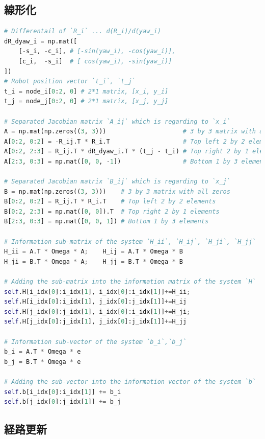 \documentclass{article}
\begin{document}
\subsection{線形化}

\begin{lstlisting}[language=python]
# Differentail of `R_i` ... d(R_i)/d(yaw_i)
dR_dyaw_i = np.mat([
    [-s_i, -c_i], # [-sin(yaw_i), -cos(yaw_i)],
    [c_i,  -s_i]  # [ cos(yaw_i), -sin(yaw_i)]
])
# Robot position vector `t_i`, `t_j`
t_i = node_i[0:2, 0] # 2*1 matrix, [x_i, y_i]
t_j = node_j[0:2, 0] # 2*1 matrix, [x_j, y_j]

# Separated Jacobian matrix `A_ij` which is regarding to `x_i`
A = np.mat(np.zeros((3, 3)))                     # 3 by 3 matrix with all zeros
A[0:2, 0:2] = -R_ij.T * R_i.T                    # Top left 2 by 2 elements
A[0:2, 2:3] = R_ij.T * dR_dyaw_i.T * (t_j - t_i) # Top right 2 by 1 elements
A[2:3, 0:3] = np.mat([0, 0, -1])                 # Bottom 1 by 3 elements

# Separated Jacobian matrix `B_ij` which is regarding to `x_j`
B = np.mat(np.zeros((3, 3)))    # 3 by 3 matrix with all zeros
B[0:2, 0:2] = R_ij.T * R_i.T    # Top left 2 by 2 elements
B[0:2, 2:3] = np.mat([0, 0]).T  # Top right 2 by 1 elements
B[2:3, 0:3] = np.mat([0, 0, 1]) # Bottom 1 by 3 elements

# Information sub-matrix of the system `H_ii`, `H_ij`, `H_ji`, `H_jj`
H_ii = A.T * Omega * A;    H_ij = A.T * Omega * B
H_ji = B.T * Omega * A;    H_jj = B.T * Omega * B

# Adding the sub-matrix into the information matrix of the system `H`
self.H[i_idx[0]:i_idx[1], i_idx[0]:i_idx[1]]+=H_ii;
self.H[i_idx[0]:i_idx[1], j_idx[0]:j_idx[1]]+=H_ij
self.H[j_idx[0]:j_idx[1], i_idx[0]:i_idx[1]]+=H_ji;
self.H[j_idx[0]:j_idx[1], j_idx[0]:j_idx[1]]+=H_jj

# Information sub-vector of the system `b_i`,`b_j`
b_i = A.T * Omega * e
b_j = B.T * Omega * e

# Adding the sub-vector into the information vector of the system `b`
self.b[i_idx[0]:i_idx[1]] += b_i
self.b[j_idx[0]:j_idx[1]] += b_j
\end{lstlisting}


\newpage

\subsection{経路更新}
\end{document}
